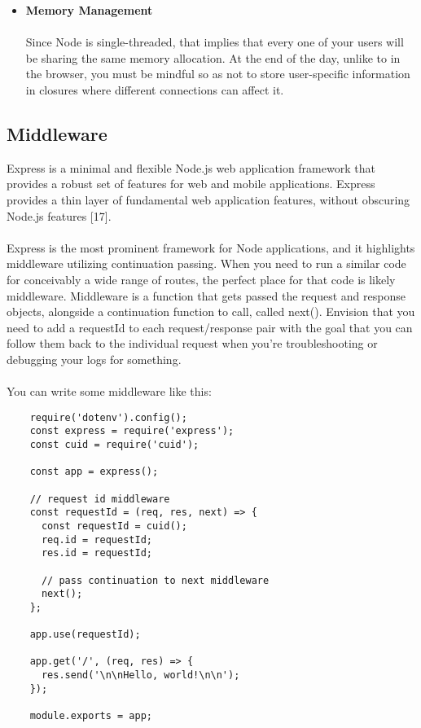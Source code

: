 \documentclass[../thesis.tex]{subfiles}
\begin{document}
\begin{itemize}
    \paragraph{}
    \item \textbf{Memory Management}
    \paragraph{}
    Since Node is single-threaded, that implies that every one of your users will be sharing the same memory allocation. At the end of the day, unlike to in the browser, you must be mindful so as not to store user-specific information in closures where different connections can affect it.
    \paragraph{}
\end{itemize}
\subsection*{Middleware}
Express is a minimal and flexible Node.js web application framework that provides a robust set of features for web and mobile applications.  Express provides a thin layer of fundamental web application features, without obscuring Node.js features [17].
\paragraph{}
Express is the most prominent framework for Node applications, and it highlights middleware utilizing continuation passing. When you need to run a similar code for conceivably a wide range of routes, the perfect place for that code is likely middleware. 
Middleware is a function that gets passed the request and response objects, alongside a continuation function to call, called next(). Envision that you need to add a requestId to each request/response pair with the goal that you can follow them back to the individual request when you're troubleshooting or debugging your logs for something.
\paragraph{}
You can write some middleware like this:
\begin{lstlisting}
    require('dotenv').config();
    const express = require('express');
    const cuid = require('cuid');
    
    const app = express();
    
    // request id middleware
    const requestId = (req, res, next) => {
      const requestId = cuid();
      req.id = requestId;
      res.id = requestId;
    
      // pass continuation to next middleware
      next();
    };
    
    app.use(requestId);
    
    app.get('/', (req, res) => {
      res.send('\n\nHello, world!\n\n');
    });
    
    module.exports = app;
    
\end{lstlisting}
\newpage
\end{document}
